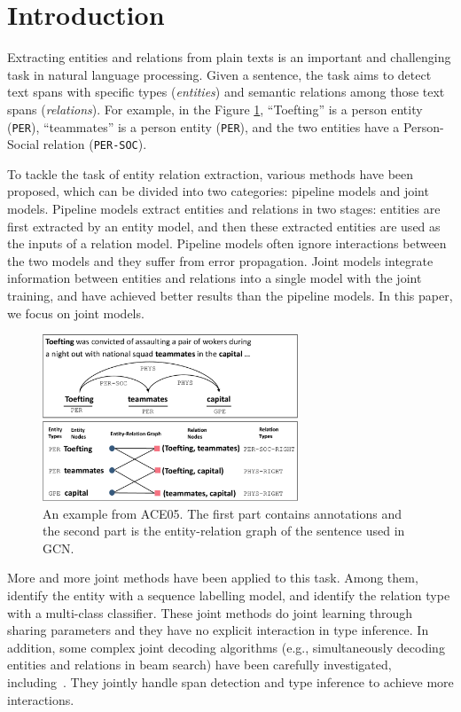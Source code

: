 \section{Introduction}
Extracting entities and relations from plain texts
is an important and challenging task in natural language processing.
Given a sentence,
the task aims to detect text spans with specific types (\emph{entities})
and semantic relations among those text spans (\emph{relations}).
For example, in the Figure \ref{fig:example},
``Toefting'' is a person entity (\texttt{PER}), 
``teammates'' is a person entity (\texttt{PER}), 
and the two entities have a Person-Social relation (\texttt{PER-SOC}).

To tackle the task of entity relation extraction,
various methods have been proposed,
which can be divided into two categories: pipeline models and joint models.
Pipeline models extract entities and relations in two stages:
entities are first extracted by an entity model,
and then these extracted entities are used as the inputs of a relation model.
Pipeline models often ignore interactions between the two models and 
they suffer from error propagation. Joint models integrate information between entities and relations
into a single model with the joint training,
and have achieved better results than the pipeline models.
In this paper, we focus on joint models.
\begin{figure}[t]
    \begin{center}
        \includegraphics[width=3.0in]{../images/fig-example.pdf}
    \end{center}
    \caption{An example from ACE05. The first part contains annotations
    and the second part is the entity-relation graph of the sentence used in GCN.}
    \label{fig:example}
\end{figure}



More and more joint methods have been applied to this task. 
Among them,
\citet{miwa-bansal:2016:P16-1,katiyar-cardie:2017:Long}
identify the entity with a sequence labelling model,
and identify the relation type with a multi-class classifier.
These joint methods do joint learning through sharing parameters 
and they have no explicit interaction in type inference.
In addition,
some complex joint decoding algorithms 
(e.g., simultaneously decoding entities and relations in beam search) 
have been carefully investigated, including~\citet{li-ji:2014:P14-1,
zhang-zhang-fu:2017:EMNLP2017,zheng-EtAl:2017:Long,wang2018joint}.
They jointly handle span detection and type inference to achieve more interactions.

